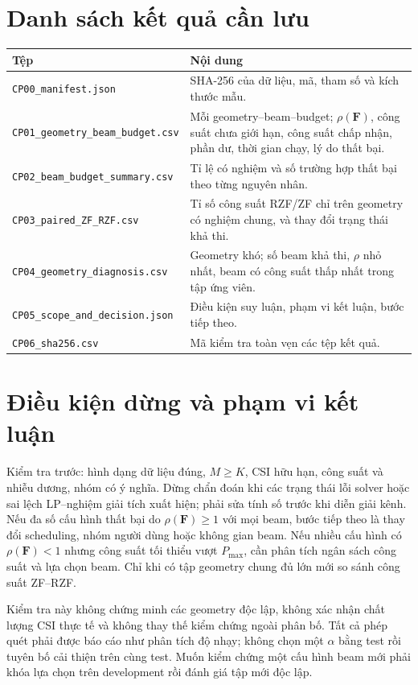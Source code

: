 \documentclass[11pt,onecolumn]{IEEEtran}
\begin{document}
\section{Danh sách kết quả cần lưu}
\begin{center}\small
\begin{tabular}{p{.29\linewidth}p{.62\linewidth}}\toprule
Tệp & Nội dung\\\midrule
\texttt{CP00\_manifest.json} & SHA-256 của dữ liệu, mã, tham số và kích thước mẫu.\\
\texttt{CP01\_geometry\_beam\_budget.csv} & Mỗi geometry--beam--budget; $\rho(\mathbf F)$, công suất chưa giới hạn, công suất chấp nhận, phần dư, thời gian chạy, lý do thất bại.\\
\texttt{CP02\_beam\_budget\_summary.csv} & Tỉ lệ có nghiệm và số trường hợp thất bại theo từng nguyên nhân.\\
\texttt{CP03\_paired\_ZF\_RZF.csv} & Tỉ số công suất RZF/ZF chỉ trên geometry có nghiệm chung, và thay đổi trạng thái khả thi.\\
\texttt{CP04\_geometry\_diagnosis.csv} & Geometry khó; số beam khả thi, $\rho$ nhỏ nhất, beam có công suất thấp nhất trong tập ứng viên.\\
\texttt{CP05\_scope\_and\_decision.json} & Điều kiện suy luận, phạm vi kết luận, bước tiếp theo.\\
\texttt{CP06\_sha256.csv} & Mã kiểm tra toàn vẹn các tệp kết quả.\\\bottomrule
\end{tabular}
\end{center}
\section{Điều kiện dừng và phạm vi kết luận}
Kiểm tra trước: hình dạng dữ liệu đúng, $M\geq K$, CSI hữu hạn, công suất và nhiễu dương, nhóm có ý nghĩa. Dừng chẩn đoán khi các trạng thái lỗi solver hoặc sai lệch LP--nghiệm giải tích xuất hiện; phải sửa tính số trước khi diễn giải kênh. Nếu đa số cấu hình thất bại do $\rho(\mathbf F)\geq1$ với mọi beam, bước tiếp theo là thay đổi scheduling, nhóm người dùng hoặc không gian beam. Nếu nhiều cấu hình có $\rho(\mathbf F)<1$ nhưng công suất tối thiểu vượt $P_{\max}$, cần phân tích ngân sách công suất và lựa chọn beam. Chỉ khi có tập geometry chung đủ lớn mới so sánh công suất ZF--RZF.

Kiểm tra này không chứng minh các geometry độc lập, không xác nhận chất lượng CSI thực tế và không thay thế kiểm chứng ngoài phân bố. Tất cả phép quét phải được báo cáo như phân tích độ nhạy; không chọn một $\alpha$ bằng test rồi tuyên bố cải thiện trên cùng test. Muốn kiểm chứng một cấu hình beam mới phải khóa lựa chọn trên development rồi đánh giá tập mới độc lập.
\end{document}
